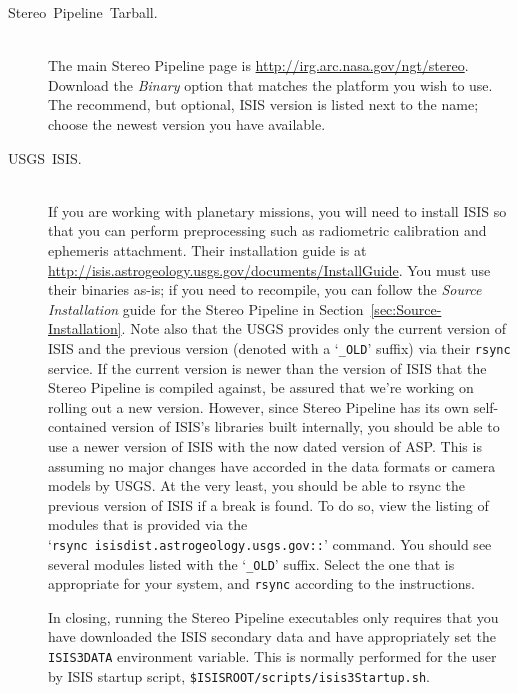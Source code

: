 \begin{description}
\item [{Stereo~Pipeline~Tarball.}] \hspace*{\fill} \\
The main Stereo Pipeline page is
\url{http://irg.arc.nasa.gov/ngt/stereo}.  Download the \emph{Binary}
option that matches the platform you wish to use. The recommend, but
optional, \ac{ISIS} version is listed next to the name; choose the
newest version you have available.

\item [{USGS~ISIS.}] \hspace*{\fill} \\
If you are working with planetary missions, you will need to install
\ac{ISIS} so that you can perform preprocessing such as radiometric
calibration and ephemeris attachment. Their installation guide is at
\url{http://isis.astrogeology.usgs.gov/documents/InstallGuide}.  You
must use their binaries as-is; if you need to recompile, you can
follow the \emph{Source Installation} guide for the Stereo Pipeline in
Section~\ref{sec:Source-Installation}.  Note also that the \ac{USGS}
provides only the current version of \ac{ISIS} and the previous
version (denoted with a `\texttt{\_OLD}' suffix) via their
\texttt{rsync} service. If the current version is newer than the
version of ISIS that the Stereo Pipeline is compiled against, be
assured that we're working on rolling out a new version. However,
since Stereo Pipeline has its own self-contained version of ISIS's
libraries built internally, you should be able to use a newer version
of ISIS with the now dated version of \ac{ASP}. This is assuming no major
changes have accorded in the data formats or camera models by
\ac{USGS}. At the very least, you should be able to rsync the previous
version of ISIS if a break is found.  To do so, view the listing of
modules that is provided via the
`\texttt{rsync~isisdist.astrogeology.usgs.gov::}' command.  You should
see several modules listed with the `\texttt{\_OLD}' suffix.  Select
the one that is appropriate for your system, and \texttt{rsync}
according to the instructions.

In closing, running the Stereo Pipeline executables only requires that
you have downloaded the ISIS secondary data and have appropriately set
the \texttt{ISIS3DATA} environment variable. This is normally
performed for the user by ISIS startup script,
\texttt{\$ISISROOT/scripts/isis3Startup.sh}.

\end{description}

